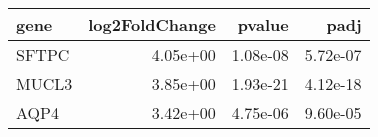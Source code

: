 \begin{tabular}{lrrr}
\toprule
 gene &  log2FoldChange &   pvalue &     padj \\
\midrule
SFTPC &        4.05e+00 & 1.08e-08 & 5.72e-07 \\
MUCL3 &        3.85e+00 & 1.93e-21 & 4.12e-18 \\
 AQP4 &        3.42e+00 & 4.75e-06 & 9.60e-05 \\
\bottomrule
\end{tabular}
